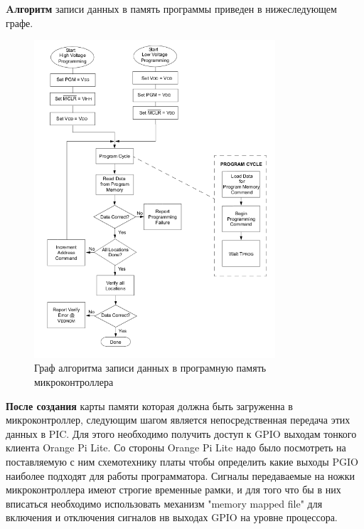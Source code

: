 \newpage

\textbf{Aлгоритм} записи данных в память программы приведен в нижеследующем графе.

\begin{figure}[h!]
    \centering
    \includegraphics[width=0.8\textwidth]{2017-05-08_at_03:42:09_screenshot.png}
    \caption{Граф алгоритма записи данных в програмную память микроконтроллера}
\end{figure}


\textbf{После создания} карты памяти которая должна быть загруженна в микроконтроллер, следующим 
шагом является непосредственная передача этих данных в PIC. Для этого необходимо получить доступ 
к GPIO выходам тонкого клиента Orange Pi Lite. Со стороны Orange Pi Lite надо было посмотреть на 
поставляемую с ним схемотехнику платы чтобы определить какие выходы PGIO наиболее подходят для работы программатора.
Сигналы передаваемые на ножки микроконтроллера имеют строгие временные рамки, и для того что бы в них вписаться необходимо 
использовать механизм "memory mapped file" для включения и отключения сигналов нв выходах GPIO на уровне процессора.

